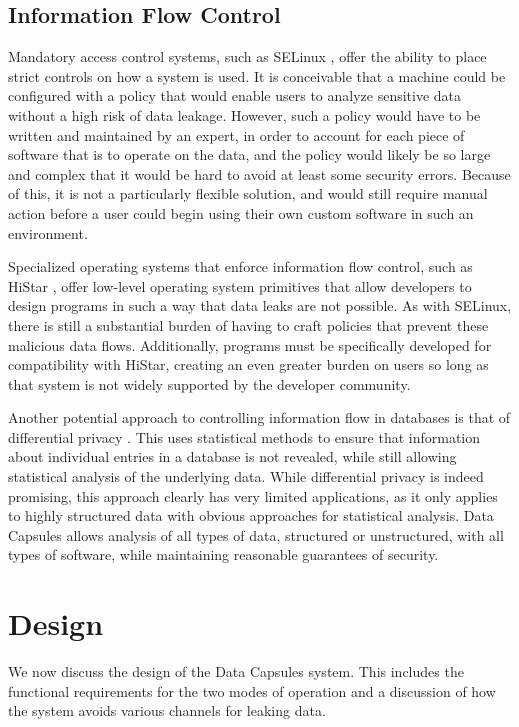 \documentclass{acm_proc_article-sp}
\begin{document}
\subsection{Information Flow Control}

Mandatory access control systems, such as SELinux \cite{selinux}, offer the
ability to place strict controls on how a system is used.  It is conceivable
that a machine could be configured with a policy that would enable users to
analyze sensitive data without a high risk of data leakage.  However, such a
policy would have to be written and maintained by an expert, in order to account
for each piece of software that is to operate on the data, and the policy would
likely be so large and complex that it would be hard to avoid at least some
security errors.  Because of this, it is not a particularly flexible solution,
and would still require manual action before a user could begin using their own
custom software in such an environment.

Specialized operating systems that enforce information flow control, such as
HiStar \cite{histar}, offer low-level operating system primitives that allow
developers to design programs in such a way that data leaks are not possible.
As with SELinux, there is still a substantial burden of having to craft policies
that prevent these malicious data flows.  Additionally, programs must be
specifically developed for compatibility with HiStar, creating an even greater
burden on users so long as that system is not widely supported by the developer
community.

Another potential approach to controlling information flow in databases is that
of differential privacy \cite{differential, differential-survey}. This uses
statistical methods to ensure that information about individual entries in a
database is not revealed, while still allowing statistical analysis of the
underlying data.  While differential privacy is indeed promising, this approach
clearly has very limited applications, as it only applies to highly structured
data with obvious approaches for statistical analysis.  Data Capsules allows
analysis of all types of data, structured or unstructured, with all types of
software, while maintaining reasonable guarantees of security.

\section{Design}

We now discuss the design of the Data Capsules system.  This includes the
functional requirements for the two modes of operation and a discussion of how
the system avoids various channels for leaking data.
\end{document}
